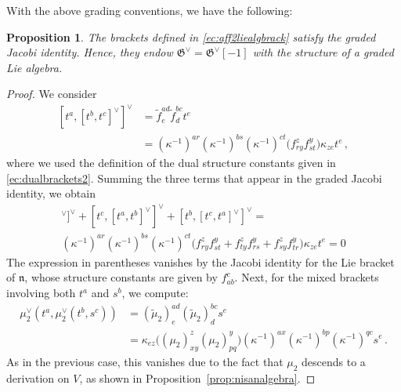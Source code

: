 \documentclass[11pt]{amsart}
\newcommand{\fn}{\mathfrak{n}}
\newcommand{\fG}{\mathfrak{G}}
\numberwithin{equation}{section}
\numberwithin{figure}{section}
\numberwithin{table}{section}
\theoremstyle{thm}
\newtheorem{prop}[theorem]{Proposition}
\numberwithin{equation}{subsection}
\theoremstyle{definition}
\theoremstyle{rem}
\begin{document}
With the above grading conventions, we have the following:
\begin{prop}
The brackets defined in \eqref{ec:aff2liealgbrack} satisfy the graded Jacobi identity. Hence, they endow \(\fG^\vee =  \mathfrak{G}^\vee[-1] \) with the structure of a graded Lie algebra.
\end{prop}

\begin{proof}
We consider  
\begin{equation}
\begin{split}
[t^a,[t^b,t^c]^\vee]^\vee
&=\tilde f^{ad}_e \tilde f^{bc}_d t^e \\
&= (\kappa^{-1})^{ar} (\kappa^{-1})^{bs} (\kappa^{-1})^{ct} \big(f_{ry}^z f_{st}^y\big) \kappa_{ze} t^e\,,
\end{split}
\end{equation}
where we used the definition of the dual structure constants given in \eqref{ec:dualbrackets2}. Summing the three terms that appear in the graded Jacobi identity, we obtain 
\begin{multline}
    [t^a,[t^b,t^c]^\vee]^\vee + [t^c,[t^a,t^b]^\vee]^\vee + [t^b,[t^c,t^a]^\vee]^\vee = \\
    (\kappa^{-1})^{ar} (\kappa^{-1})^{bs} (\kappa^{-1})^{ct} \big(f_{ry}^z f_{st}^y+f_{ty}^z f_{rs}^y+f_{sy}^z f_{tr}^y\big) \kappa_{ze} t^e = 0
\end{multline}
The expression in parentheses vanishes by the Jacobi identity for the Lie bracket of $\fn$, whose structure constants are given by $f_{ab}^c$. Next, for the mixed brackets involving both $t^a$ and $s^b$, we compute:
\begin{equation}
    \begin{split}
         \mu_2^\vee(t^a,\mu_2^\vee(t^b,s^c))
    &=(\tilde\mu_2)^{ad}_e(\tilde\mu_2)^{bc}_d s^e\\
    &= \kappa_{ez}\big( (\mu_2)_{xy}^z(\mu_2)_{pq}^y\big) (\kappa^{-1})^{ax}(\kappa^{-1})^{bp}(\kappa^{-1})^{qc} s^e \,.
    \end{split}
\end{equation}
As in the previous case, this vanishes due to the fact that $\mu_2$ descends to a derivation on $V$, as shown in Proposition~\ref{prop:nisanalgebra}.
\end{proof}

\medskip
\end{document}
